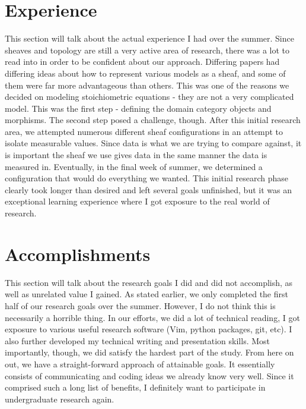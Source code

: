 \documentclass[12pt]{article}
\begin{document}
	\section*{Experience}
	This section will talk about the actual experience I had over the summer. Since sheaves and topology are still a very active area of research, there was a lot to read into in order to be confident about our approach. Differing papers had differing ideas about how to represent various models as a sheaf, and some of them were far more advantageous than others. This was one of the reasons we decided on modeling stoichiometric equations - they are not a very complicated model. This was the first step - defining the domain category objects and morphisms. The second step posed a challenge, though. After this initial research area, we attempted numerous different sheaf configurations in an attempt to isolate measurable values. Since data is what we are trying to compare against, it is important the sheaf we use gives data in the same manner the data is measured in. Eventually, in the final week of summer, we determined a configuration that would do everything we wanted. This initial research phase clearly took longer than desired and left several goals unfinished, but it was an exceptional learning experience where I got exposure to the real world of research.

	\section*{Accomplishments}
	This section will talk about the research goals I did and did not accomplish, as well as unrelated value I gained. As stated earlier, we only completed the first half of our research goals over the summer. However, I do not think this is necessarily a horrible thing. In our efforts, we did a lot of technical reading, I got exposure to various useful research software (Vim, python packages, git, etc). I also further developed my technical writing and presentation skills. Most importantly, though, we did satisfy the hardest part of the study. From here on out, we have a straight-forward approach of attainable goals. It essentially consists of communicating and coding ideas we already know very well. Since it comprised such a long list of benefits, I definitely want to participate in undergraduate research again.
\end{document}
